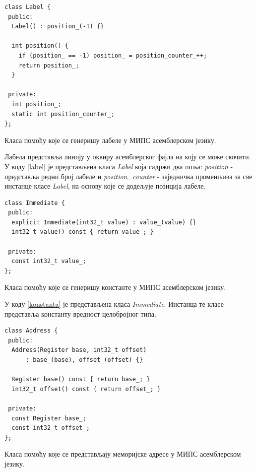 \documentclass[12pt,oneside]{memoir}
\begin{document}
\begin{listing}
\begin{verbatim}
class Label {
 public:
  Label() : position_(-1) {}

  int position() {
    if (position_ == -1) position_ = position_counter_++;
    return position_;
  }

 private:
  int position_;
  static int position_counter_;
}; 
\end{verbatim}
\caption{Класа помоћу које се генеришу лабеле у МИПС асемблерском језику.}
\label{label}
\end{listing}

Лабела представља линију у оквиру асемблерског фајла на коју се може скочити. У коду \ref{label} је представљена класа \textit{Label} која садржи два поља: \textit{position} - представља редни број лабеле и \textit{position\_counter} - заједничка променљива за све инстанце класе \textit{Label}, на основу које се додељује позиција лабеле.\\

\begin{listing}
\begin{verbatim}
class Immediate {
 public:
  explicit Immediate(int32_t value) : value_(value) {}
  int32_t value() const { return value_; }

 private:
  const int32_t value_;
};
\end{verbatim}
\caption{Класа помоћу које се генеришу константе у МИПС асемблерском језику.}
\label{konstanta}
\end{listing}

У коду \ref{konstanta} је представљена класа \textit{Immediate}. Инстанца те класе представља константу вредност целобројног типа.\\

\begin{listing}
\begin{verbatim}
class Address {
 public:
  Address(Register base, int32_t offset)
      : base_(base), offset_(offset) {}

  Register base() const { return base_; }
  int32_t offset() const { return offset_; }

 private:
  const Register base_;
  const int32_t offset_;
};
\end{verbatim}
\caption{Класа помоћу које се представљају меморијске адресе у МИПС асемблерском језику.}
\label{adresa}
\end{listing}
\end{document}
